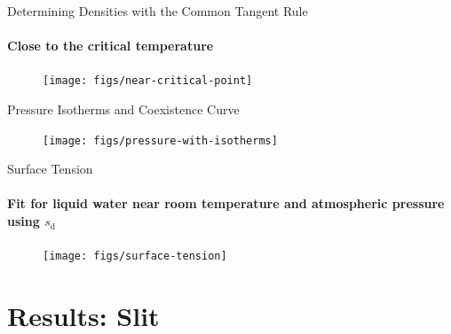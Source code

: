 \documentclass{beamer}
\begin{document}
\begin{frame}[fragile]{Determining Densities with the Common Tangent Rule}
\framesubtitle{Close to the critical temperature}
\begin{figure}
\begin{center}
\texttt{[image: figs/near-critical-point]}
\end{center}
\end{figure}
\end{frame}

\begin{frame}[fragile]{Pressure Isotherms and Coexistence Curve}
\begin{figure}
\begin{center}
\texttt{[image: figs/pressure-with-isotherms]}
\end{center}
\end{figure} 
\end{frame}


\begin{frame}[fragile]{Surface Tension}
\framesubtitle{Fit for liquid water near room temperature and 
atmospheric pressure using $s_\text{d}$}
\begin{figure}
\begin{center}
\texttt{[image: figs/surface-tension]}
\end{center}
\end{figure} 
\end{frame}

\section{Results: Slit}
\subsection*{}

\end{document}
